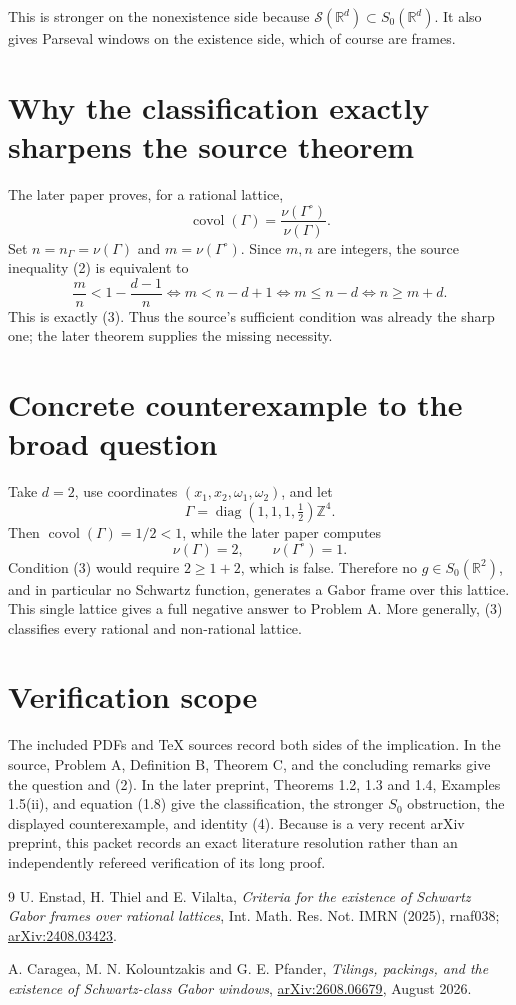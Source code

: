 \documentclass[11pt]{article}
\newcommand{\Szero}{S_0}
\newcommand{\covol}{\operatorname{covol}}
\begin{document}
This is stronger on the nonexistence side because
$\mathcal S(\mathbb R^d)\subset\Szero(\mathbb R^d)$.  It also gives Parseval
windows on the existence side, which of course are frames.

\section*{Why the classification exactly sharpens the source theorem}
The later paper proves, for a rational lattice,
\begin{equation*}
 \covol(\Gamma)=\frac{\nu(\Gamma^\circ)}{\nu(\Gamma)}. \tag{4}
\end{equation*}
Set $n=n_\Gamma=\nu(\Gamma)$ and $m=\nu(\Gamma^\circ)$.  Since $m,n$ are
integers, the source inequality (2) is equivalent to
\[
 \frac mn<1-\frac{d-1}{n}
 \iff m<n-d+1
 \iff m\le n-d
 \iff n\ge m+d.
\]
This is exactly (3).  Thus the source's sufficient condition was already the
sharp one; the later theorem supplies the missing necessity.

\section*{Concrete counterexample to the broad question}
Take $d=2$, use coordinates $(x_1,x_2,\omega_1,\omega_2)$, and let
\[
 \Gamma=\operatorname{diag}(1,1,1,\tfrac12)\mathbb Z^4.
\]
Then $\covol(\Gamma)=1/2<1$, while the later paper computes
\[
 \nu(\Gamma)=2,
 \qquad \nu(\Gamma^\circ)=1.
\]
Condition (3) would require $2\ge1+2$, which is false.  Therefore no
$g\in\Szero(\mathbb R^2)$, and in particular no Schwartz function, generates
a Gabor frame over this lattice.  This single lattice gives a full negative
answer to Problem A.  More generally, (3) classifies every rational and
non-rational lattice.

\section*{Verification scope}
The included PDFs and TeX sources record both sides of the implication.  In
the source, Problem A, Definition B, Theorem C, and the concluding remarks
give the question and (2).  In the later preprint, Theorems 1.2, 1.3 and 1.4,
Examples 1.5(ii), and equation (1.8) give the classification, the stronger
$\Szero$ obstruction, the displayed counterexample, and identity (4).
Because \cite{CKP} is a very recent arXiv preprint, this packet records an
exact literature resolution rather than an independently refereed
verification of its long proof.

\begin{thebibliography}{9}
U. Enstad, H. Thiel and E. Vilalta,
\emph{Criteria for the existence of Schwartz Gabor frames over rational
lattices}, Int. Math. Res. Not. IMRN (2025), rnaf038;
\href{https://arxiv.org/abs/2408.03423}{arXiv:2408.03423}.

A. Caragea, M. N. Kolountzakis and G. E. Pfander,
\emph{Tilings, packings, and the existence of Schwartz-class Gabor windows},
\href{https://arxiv.org/abs/2608.06679}{arXiv:2608.06679}, August 2026.
\end{thebibliography}
\end{document}
